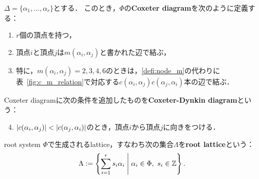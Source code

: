 \begin{defi}
  $\Delta = \{\alpha_1, \ldots, \alpha_r\}$とする．
  このとき，$\Phi$の\textbf{Coxeter diagram}を次のように定義する：
  \begin{enumerate}[label=(\roman*)]
    \item $r$個の頂点を持つ，
    \item 頂点$i$と頂点$j$は$m(\alpha_i, \alpha_j)$と書かれた辺で結ぶ，\label{defi:node_m}
    \item 特に，$m(\alpha_i, \alpha_j) = 2, 3, 4, 6$のときは，\ref{defi:node_m}の代わりに表~\ref{fig:c_m_relation}で対応する$c(\alpha_i, \alpha_j) c(\alpha_j, \alpha_i)$本の辺で結ぶ．
  \end{enumerate}
\end{defi}

\begin{defi}
  Coxeter diagramに次の条件を追加したものを\textbf{Coxeter-Dynkin diagram}という：
  \begin{enumerate}[label=(\roman*)]
    \setcounter{enumi}{3}
    \item $\left| c(\alpha_i, \alpha_j) \right| < \left| c(\alpha_j, \alpha_i) \right|$のとき，頂点$i$から頂点$j$に向きをつける．
  \end{enumerate}
\end{defi}

\begin{defi}
  root system $\Phi$で生成されるlattice，すなわち次の集合$\Lambda$を\textbf{root lattice}という：
  \begin{equation}
    \Lambda := \left\lbrace \sum_{i=1}^{r} s_i \alpha_i \mathrel{} \middle| \mathrel{} \alpha_i \in \Phi,\ s_i \in \mathbb{Z} \right\rbrace.
  \end{equation}
\end{defi}
